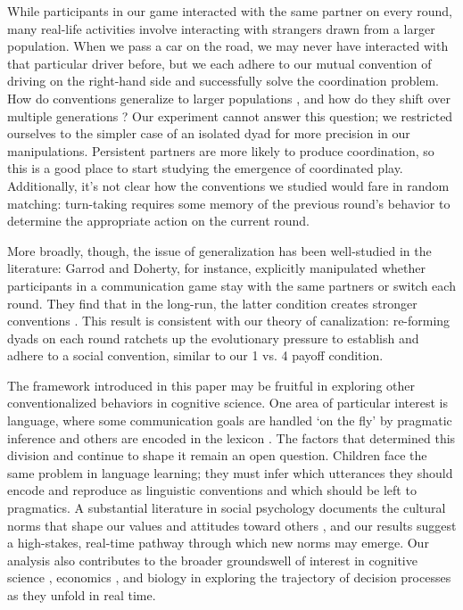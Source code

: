 \documentclass[10pt,letterpaper]{article}
\begin{document}
While participants in our game interacted with the same partner on every round, many real-life activities involve interacting with strangers drawn from a larger population. When we pass a car on the road, we may never have interacted with that particular driver before, but we each adhere to our mutual convention of driving on the right-hand side and successfully solve the coordination problem. How do conventions generalize to larger populations \cite{GarrodDoherty94_GroupConventionsLinguistics, WeberCamerer03_CulturalConflict}, and how do they shift over multiple generations \cite{SchotterSopher03}? Our experiment cannot answer this question; we restricted ourselves to the simpler case of an isolated dyad for more precision in our manipulations. Persistent partners are more likely to produce coordination, so this is a good place to start studying the emergence of coordinated play. Additionally, it's not clear how the conventions we studied would fare in random matching: turn-taking requires some memory of the previous round's behavior to determine the appropriate action on the current round.  

More broadly, though, the issue of generalization has been well-studied in the literature: Garrod and Doherty, for instance, explicitly manipulated whether participants in a communication game stay with the same partners or switch each round. They find that in the long-run, the latter condition creates stronger conventions \cite{GarrodDoherty94_GroupConventionsLinguistics}.  This result is consistent with our theory of canalization: re-forming dyads on each round ratchets up the evolutionary pressure to establish and adhere to a social convention, similar to our 1 vs. 4 payoff condition. 

The framework introduced in this paper may be fruitful in exploring other conventionalized behaviors in cognitive science. One area of particular interest is language, where some communication goals are handled `on the fly' by pragmatic inference and others are encoded in the lexicon \cite{Grice75_LogicConversation, GarrodDoherty94_GroupConventionsLinguistics}. The factors that determined this division and continue to shape it remain an open question. Children face the same problem in language learning; they must infer which utterances they should encode and reproduce as linguistic conventions and which should be left to pragmatics. A substantial literature in social psychology documents the cultural norms that shape our values and attitudes toward others \cite{Bicchieri05_DynamicsSocialNorms}, and our results suggest a high-stakes, real-time pathway through which new norms may emerge. Our analysis also contributes to the broader groundswell of interest in cognitive science \cite{SpiveyDale06, KoopJohnson11, Beer00}, economics \cite{OpreaCharnessFriedman14_ContinuousTime, FriedmanOprea12_ContinuousDilemma}, and biology \cite{vanDoornRiebliTaborsky14_CoactionReciprocityContinuousTime} in exploring the trajectory of decision processes as they unfold in real time. 
\end{document}
